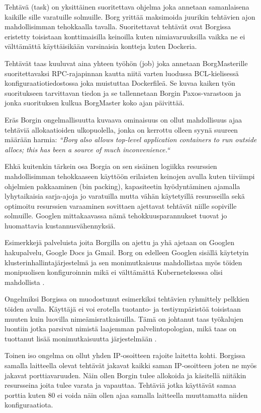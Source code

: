 \documentclass[finnish]{tktltiki2}
\theoremstyle{definition}
\theoremstyle{remark}
\begin{document}
Tehtävä (task) on yksittäinen suoritettava ohjelma joka annetaan samanlaisena kaikille sille varatuille solmuille. Borg yrittää maksimoida juurikin tehtävien ajon mahdollisimman tehokkaalla tavalla. Suoritettavat tehtävät ovat Borgissa eristetty toisistaan konttimaisilla keinoilla kuten nimiavaruuksilla vaikka ne ei välttämättä käyttäisikään varsinaisia kontteja kuten Dockeria.

Tehtävät taas kuuluvat aina yhteen työhön (job) joka annetaan BorgMasterille suoritettavaksi RPC-rajapinnan kautta niitä varten luodussa BCL-kielisessä konfiguraatiotiedostossa joka muistuttaa Dockerfileä. Se kuvaa kaiken työn suoritukseen tarvittavan tiedon ja se tallennetaan Borgin Paxos-varastoon ja jonka suorituksen kulkua BorgMaster koko ajan päivittää.

Eräs Borgin ongelmallisuutta kuvaava ominaisuus on ollut mahdollisuus ajaa tehtäviä allokaatioiden ulkopuolella, jonka on kerrottu olleen syynä suureen määrään harmia: \textit{``Borg also allows top-level application containers to run outside allocs; this has been a source of much inconvenience.``}

Ehkä kuitenkin tärkein osa Borgia on sen sisäinen logiikka resurssien mahdollisimman tehokkaaseen käyttöön erilaisten keinojen avulla kuten tiiviimpi ohjelmien pakkaaminen (bin packing), kapasiteetin hyödyntäminen ajamalla lyhytaikaisia sarja-ajoja jo varatuilla mutta vähän käytetyillä resursseilla sekä optimoitu resurssien varaaminen sovittaen ajettavat tehtävät niille sopiville solmuille. Googlen mittakaavassa nämä tehokkuusparannukset tuovat jo huomattavia kustannusvähennyksiä.

Esimerkkejä palveluista joita Borgilla on ajettu ja yhä ajetaan on Googlen hakupalvelu, Google Docs ja Gmail. Borg on edelleen Googlen sisällä käytetyin klusterinhallintajärjestelmä ja sen monimutkaisuus mahdollistaa myös töiden monipuolisen konfiguroinnin mikä ei välttämättä Kuberneteksessa olisi mahdollista \cite{management-with-borg}.

Ongelmiksi Borgissa on muodostunut esimerkiksi tehtävien ryhmittely pelkkien töiden avulla. Käyttäjä ei voi erotella tuotanto- ja testiympäristöä toisistaan muuten kuin luovilla nimeämisratkaisuilla. Tämä on johtanut taas työkalujen luontiin jotka parsivat nimistä laajemman palvelintopologian, mikä taas on tuottanut lisää monimutkaisuutta järjestelmään \cite{borg-goto-youtube}.

Toinen iso ongelma on ollut yhden IP-osoitteen rajoite laitetta kohti. Borgissa samalla laitteella olevat tehtävät jakavat kaikki saman IP-osoitteen joten ne myös jakavat porttiavaruuden. Näin ollen Borgin tulee allokoida ja käsitellä niitäkin resursseina joita tulee varata ja vapauttaa. Tehtäviä jotka käyttävät samaa porttia kuten 80 ei voida näin ollen ajaa samalla laitteella muuttamatta niiden konfiguraatiota.
\end{document}
